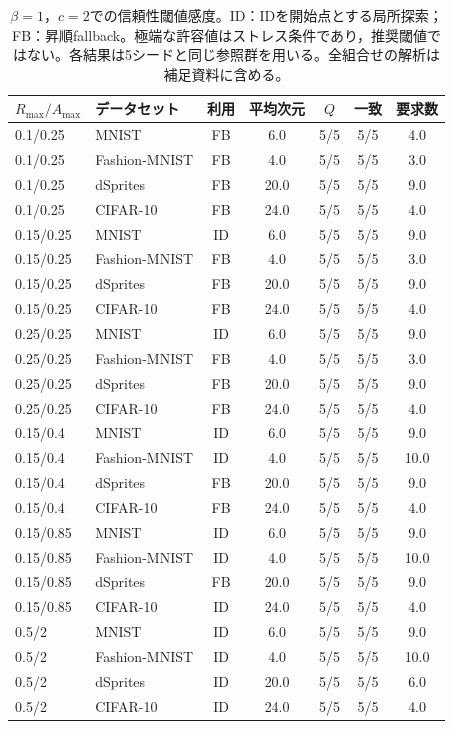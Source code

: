 \documentclass[11pt,a4paper]{ltjsarticle}
\begin{document}
\begin{table}[H]
\caption{$\beta=1$，$c=2$での信頼性閾値感度。ID：IDを開始点とする局所探索；FB：昇順fallback。極端な許容値はストレス条件であり，推奨閾値ではない。各結果は5シードと同じ参照群を用いる。全組合せの解析は補足資料に含める。}\label{tab:reliability}
\small
\setlength{\tabcolsep}{3pt}
\begin{tabular*}{\textwidth}{@{\extracolsep{\fill}}llccccc@{}}
\toprule
$R_{\max}/A_{\max}$ & データセット & 利用 & 平均次元 & $Q$ & 一致 & 要求数 \\
\midrule
0.1/0.25 & MNIST & FB & 6.0 & 5/5 & 5/5 & 4.0 \\
0.1/0.25 & Fashion-MNIST & FB & 4.0 & 5/5 & 5/5 & 3.0 \\
0.1/0.25 & dSprites & FB & 20.0 & 5/5 & 5/5 & 9.0 \\
0.1/0.25 & CIFAR-10 & FB & 24.0 & 5/5 & 5/5 & 4.0 \\
0.15/0.25 & MNIST & ID & 6.0 & 5/5 & 5/5 & 9.0 \\
0.15/0.25 & Fashion-MNIST & FB & 4.0 & 5/5 & 5/5 & 3.0 \\
0.15/0.25 & dSprites & FB & 20.0 & 5/5 & 5/5 & 9.0 \\
0.15/0.25 & CIFAR-10 & FB & 24.0 & 5/5 & 5/5 & 4.0 \\
0.25/0.25 & MNIST & ID & 6.0 & 5/5 & 5/5 & 9.0 \\
0.25/0.25 & Fashion-MNIST & FB & 4.0 & 5/5 & 5/5 & 3.0 \\
0.25/0.25 & dSprites & FB & 20.0 & 5/5 & 5/5 & 9.0 \\
0.25/0.25 & CIFAR-10 & FB & 24.0 & 5/5 & 5/5 & 4.0 \\
0.15/0.4 & MNIST & ID & 6.0 & 5/5 & 5/5 & 9.0 \\
0.15/0.4 & Fashion-MNIST & ID & 4.0 & 5/5 & 5/5 & 10.0 \\
0.15/0.4 & dSprites & FB & 20.0 & 5/5 & 5/5 & 9.0 \\
0.15/0.4 & CIFAR-10 & FB & 24.0 & 5/5 & 5/5 & 4.0 \\
0.15/0.85 & MNIST & ID & 6.0 & 5/5 & 5/5 & 9.0 \\
0.15/0.85 & Fashion-MNIST & ID & 4.0 & 5/5 & 5/5 & 10.0 \\
0.15/0.85 & dSprites & FB & 20.0 & 5/5 & 5/5 & 9.0 \\
0.15/0.85 & CIFAR-10 & ID & 24.0 & 5/5 & 5/5 & 4.0 \\
0.5/2 & MNIST & ID & 6.0 & 5/5 & 5/5 & 9.0 \\
0.5/2 & Fashion-MNIST & ID & 4.0 & 5/5 & 5/5 & 10.0 \\
0.5/2 & dSprites & ID & 20.0 & 5/5 & 5/5 & 6.0 \\
0.5/2 & CIFAR-10 & ID & 24.0 & 5/5 & 5/5 & 4.0 \\
\bottomrule\end{tabular*}
\end{table}
\end{document}
